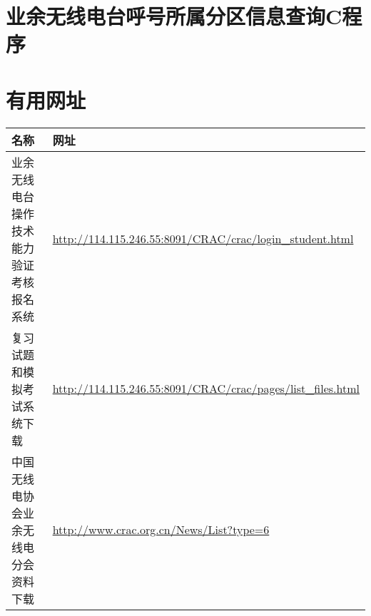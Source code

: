 

\newpage


\section{业余无线电台呼号所属分区信息查询C程序}



\newpage

\section{有用网址}

\begin{longtable}{|p{8cm}|p{8cm}|}
	\hline
	\textbf{名称} & \textbf{网址} \\
	\hline
	业余无线电台操作技术能力验证考核报名系统 & \url{http://114.115.246.55:8091/CRAC/crac/login_student.html} \\
	\hline
	复习试题和模拟考试系统下载 & \url{http://114.115.246.55:8091/CRAC/crac/pages/list_files.html} \\
	\hline
	中国无线电协会业余无线电分会资料下载 & \url{http://www.crac.org.cn/News/List?type=6} \\
	\hline
\end{longtable}
